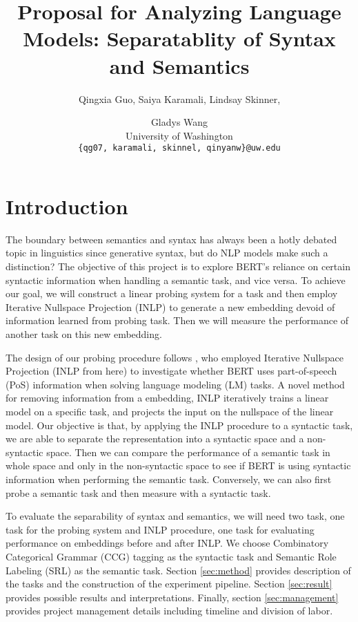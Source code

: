 \documentclass[11pt,a4paper]{article}
\title{Proposal for Analyzing Language Models: Separatablity of Syntax and Semantics}
\author{Qingxia Guo, Saiya Karamali, Lindsay Skinner, \and Gladys Wang
 \\ University of Washington \\ 
\texttt{\{qg07, karamali, skinnel, qinyanw\}@uw.edu}\\ 
}
\date{}
\begin{document}
\maketitle

\section{Introduction}

The boundary between semantics and syntax has always been a hotly debated topic in linguistics since generative syntax, but do NLP models make such a distinction? The objective of this project is to explore BERT\rq s reliance on certain syntactic information when handling a semantic task, and vice versa. To achieve our goal, we will construct a linear probing system for a task and then employ Iterative Nullspace Projection (INLP) \citep{inlp} to generate a new embedding devoid of information learned from probing task. Then we will measure the performance of another task on this new embedding.

The design of our probing procedure follows \citealp{amnesia}, who employed Iterative Nullspace Projection (INLP from here) to investigate whether BERT uses part-of-speech (PoS) information when solving language modeling (LM) tasks. A novel method for removing information from a embedding, INLP iteratively trains a linear model on a specific task, and projects the input on the nullspace of the linear model. Our objective is that, by applying the INLP procedure to a syntactic task, we are able to separate the representation into a syntactic space and a non-syntactic space. Then we can compare the performance of a semantic task in whole space and only in the non-syntactic space to see if BERT is using syntactic information when performing the semantic task. Conversely, we can also first probe a semantic task and then measure with a syntactic task. 

To evaluate the separability of syntax and semantics, we will need two task, one task for the probing system and INLP procedure, one task for evaluating performance on embeddings before and after INLP. We choose Combinatory Categorical Grammar (CCG) tagging as the syntactic task and Semantic Role Labeling (SRL) as the semantic task. Section \ref{sec:method} provides description of the tasks and the construction of the experiment pipeline. Section \ref{sec:result} provides possible results and interpretations. Finally, section \ref{sec:management} provides project management details including timeline and division of labor.
\end{document}
